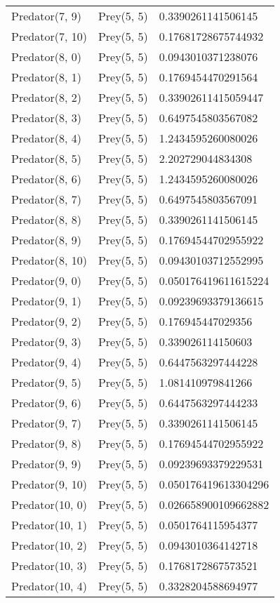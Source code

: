 \begin{longtable}{| p{} | p{} | p{} |}
Predator(7, 9) & Prey(5, 5) &0.3390261141506145\\
Predator(7, 10) & Prey(5, 5) &0.17681728675744932\\
Predator(8, 0) & Prey(5, 5) &0.0943010371238076\\
Predator(8, 1) & Prey(5, 5) &0.1769454470291564\\
Predator(8, 2) & Prey(5, 5) &0.33902611415059447\\
Predator(8, 3) & Prey(5, 5) &0.6497545803567082\\
Predator(8, 4) & Prey(5, 5) &1.2434595260080026\\
Predator(8, 5) & Prey(5, 5) &2.202729044834308\\
Predator(8, 6) & Prey(5, 5) &1.2434595260080026\\
Predator(8, 7) & Prey(5, 5) &0.6497545803567091\\
Predator(8, 8) & Prey(5, 5) &0.3390261141506145\\
Predator(8, 9) & Prey(5, 5) &0.17694544702955922\\
Predator(8, 10) & Prey(5, 5) &0.09430103712552995\\
Predator(9, 0) & Prey(5, 5) &0.050176419611615224\\
Predator(9, 1) & Prey(5, 5) &0.09239693379136615\\
Predator(9, 2) & Prey(5, 5) &0.176945447029356\\
Predator(9, 3) & Prey(5, 5) &0.339026114150603\\
Predator(9, 4) & Prey(5, 5) &0.6447563297444228\\
Predator(9, 5) & Prey(5, 5) &1.081410979841266\\
Predator(9, 6) & Prey(5, 5) &0.6447563297444233\\
Predator(9, 7) & Prey(5, 5) &0.3390261141506145\\
Predator(9, 8) & Prey(5, 5) &0.17694544702955922\\
Predator(9, 9) & Prey(5, 5) &0.09239693379229531\\
Predator(9, 10) & Prey(5, 5) &0.050176419613304296\\
Predator(10, 0) & Prey(5, 5) &0.026658900109662882\\
Predator(10, 1) & Prey(5, 5) &0.0501764115954377\\
Predator(10, 2) & Prey(5, 5) &0.0943010364142718\\
Predator(10, 3) & Prey(5, 5) &0.1768172867573521\\
Predator(10, 4) & Prey(5, 5) &0.3328204588694977\\

\end{longtable}
